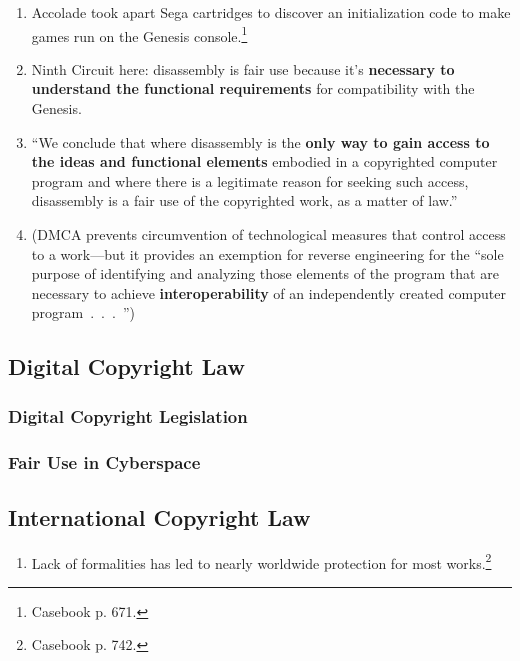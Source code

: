 \begin{enumerate}
    \item Accolade took apart Sega cartridges to discover an initialization 
    code to make games run on the Genesis console.\footnote{Casebook p. 671.}
    \item Ninth Circuit here: disassembly is fair use because it's 
    \textbf{necessary to understand the functional requirements} for 
    compatibility with the Genesis.
    \item ``We conclude that where disassembly is the \textbf{only way to gain access 
    to the ideas and functional elements} embodied in a copyrighted computer 
    program and where there is a legitimate reason for seeking such access, 
    disassembly is a fair use of the copyrighted work, as a matter of 
    law.''
    \item (DMCA prevents circumvention of technological measures that control 
    access to a work---but it provides an exemption for reverse engineering 
    for the ``sole purpose of identifying and analyzing those elements of the 
    program that are necessary to achieve \textbf{interoperability} of an 
    independently created computer program~.~.~.~'')
\end{enumerate}

\subsection{Digital Copyright Law}

\subsubsection{Digital Copyright Legislation}


\subsubsection{Fair Use in Cyberspace}


\subsection{International Copyright Law}

\begin{enumerate}
    \item Lack of formalities has led to nearly worldwide protection for most 
    works.\footnote{Casebook p. 742.}
\end{enumerate}


